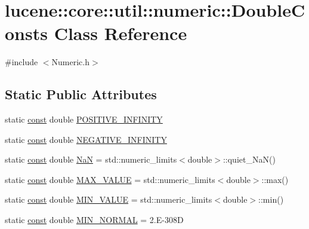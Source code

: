 \hypertarget{classlucene_1_1core_1_1util_1_1numeric_1_1DoubleConsts}{}\section{lucene\+:\+:core\+:\+:util\+:\+:numeric\+:\+:Double\+Consts Class Reference}
\label{classlucene_1_1core_1_1util_1_1numeric_1_1DoubleConsts}


{\ttfamily \#include $<$Numeric.\+h$>$}

\subsection*{Static Public Attributes}
\begin{DoxyCompactItemize}
\item 
static \mbox{\hyperlink{ZlibCrc32_8h_a2c212835823e3c54a8ab6d95c652660e}{const}} double \mbox{\hyperlink{classlucene_1_1core_1_1util_1_1numeric_1_1DoubleConsts_ab0bdae992f5d0fe5b7777939cf538913}{P\+O\+S\+I\+T\+I\+V\+E\+\_\+\+I\+N\+F\+I\+N\+I\+TY}}
\item 
static \mbox{\hyperlink{ZlibCrc32_8h_a2c212835823e3c54a8ab6d95c652660e}{const}} double \mbox{\hyperlink{classlucene_1_1core_1_1util_1_1numeric_1_1DoubleConsts_a9d874110cbfbb96c557de6fc06790c74}{N\+E\+G\+A\+T\+I\+V\+E\+\_\+\+I\+N\+F\+I\+N\+I\+TY}}
\item 
static \mbox{\hyperlink{ZlibCrc32_8h_a2c212835823e3c54a8ab6d95c652660e}{const}} double \mbox{\hyperlink{classlucene_1_1core_1_1util_1_1numeric_1_1DoubleConsts_a7fe163af563d638bea6d4d226739ddab}{NaN}} = std\+::numeric\+\_\+limits$<$double$>$\+::quiet\+\_\+\+NaN()
\item 
static \mbox{\hyperlink{ZlibCrc32_8h_a2c212835823e3c54a8ab6d95c652660e}{const}} double \mbox{\hyperlink{classlucene_1_1core_1_1util_1_1numeric_1_1DoubleConsts_a0e64f4e91ba2447a8f89a6d7ec75428d}{M\+A\+X\+\_\+\+V\+A\+L\+UE}} = std\+::numeric\+\_\+limits$<$double$>$\+::max()
\item 
static \mbox{\hyperlink{ZlibCrc32_8h_a2c212835823e3c54a8ab6d95c652660e}{const}} double \mbox{\hyperlink{classlucene_1_1core_1_1util_1_1numeric_1_1DoubleConsts_aba5dd5bfeb948a635f25351eb1dc1c9c}{M\+I\+N\+\_\+\+V\+A\+L\+UE}} = std\+::numeric\+\_\+limits$<$double$>$\+::min()
\item 
static \mbox{\hyperlink{ZlibCrc32_8h_a2c212835823e3c54a8ab6d95c652660e}{const}} double \mbox{\hyperlink{classlucene_1_1core_1_1util_1_1numeric_1_1DoubleConsts_acb2966fdb406ca24e5fd59c27838584a}{M\+I\+N\+\_\+\+N\+O\+R\+M\+AL}} = 2.\+E-\/308D

\end{DoxyCompactItemize}
